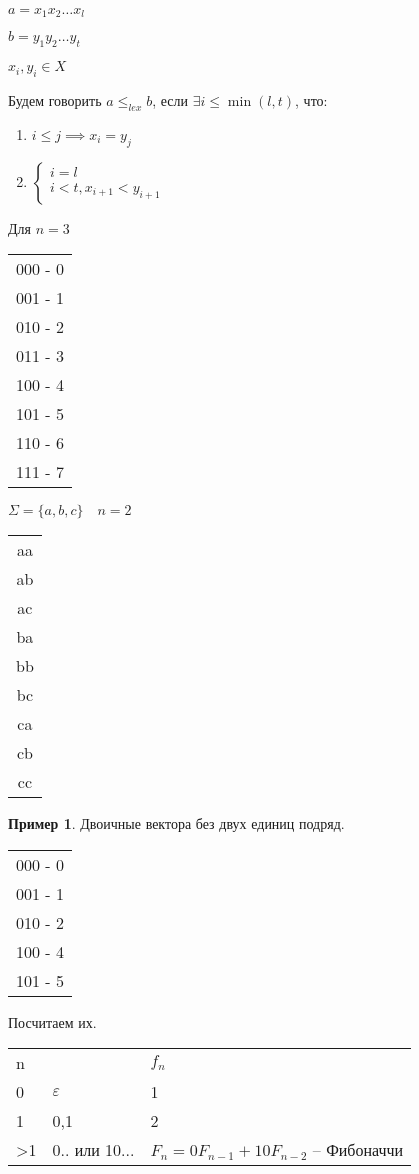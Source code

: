 \documentclass{book}
\theoremstyle{definition}
\newtheorem*{example}{Пример}
\begin{document}
$a = x_1x_2\ldots x_{l}$

$b = y_1y_2\ldots y_t$

$x_{i}, y_{i} \in X$

Будем говорить $a\leqslant _{lex} b$, если $\exists i\leqslant \min(l, t)$, что:
 \begin{enumerate}
    \item $i\leqslant j \implies  x_{i}  = y_{j} $
    \item  $\begin{cases}
        i = l\\
        i<t, x_{i+1}<y_{i+1}
    \end{cases}$
\end{enumerate}

Для $n=3$
\begin{tabular}{c}
000 - 0\\001 - 1\\010 - 2\\011 - 3\\100 - 4 \\101 - 5\\110 - 6\\111 - 7\\
\end{tabular}

$\Sigma = \{a,b,c\}\quad n = 2$
\begin{tabular}{c}
    aa\\ab\\ac\\ba\\bb\\bc\\ca\\cb\\cc\\
\end{tabular}

\begin{example}
    Двоичные вектора без двух единиц подряд.
\begin{tabular}{c}
000 - 0\\001 - 1\\010 - 2\\100 - 4 \\101 - 5
\end{tabular}

Посчитаем их. 

\begin{tabular}{lll}
    n & & $f_n$\\
    0&$\varepsilon$&1\\
    1&0,1&2\\
    >1&0.. или 10...&$F_n = 0F_{n-1} + 10F_{n-2}$ -- Фибоначчи\\
\end{tabular}
\end{example}
\end{document}
